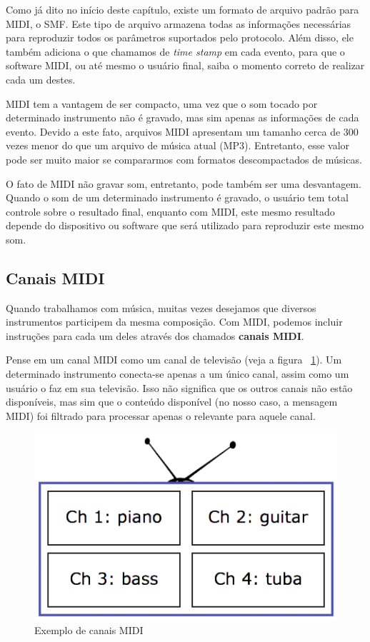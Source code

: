             Como já dito no início deste capítulo, existe um formato de arquivo padrão para MIDI, o SMF. Este tipo de arquivo armazena todas as informações necessárias para reproduzir todos os parâmetros suportados pelo protocolo. Além disso, ele também adiciona o que chamamos de \textit{time stamp} em cada evento, para que o software MIDI, ou até mesmo o usuário final, saiba o momento correto de realizar cada um destes.

            MIDI tem a vantagem de ser compacto, uma vez que o som tocado por determinado instrumento não é gravado, mas sim apenas as informações de cada evento. Devido a este fato, arquivos MIDI apresentam um tamanho cerca de 300 vezes menor do que um arquivo de música atual (MP3). Entretanto, esse valor pode ser muito maior se compararmos com formatos descompactados de músicas.

            O fato de MIDI não gravar som, entretanto, pode também ser uma desvantagem. Quando o som de um determinado instrumento é gravado, o usuário tem total controle sobre o resultado final, enquanto com MIDI, este mesmo resultado depende do dispositivo ou software que será utilizado para reproduzir este mesmo som.

        \subsection{Canais MIDI}

            Quando trabalhamos com música, muitas vezes desejamos que diversos instrumentos participem da mesma composição. Com MIDI, podemos incluir instruções para cada um deles através dos chamados \textbf{canais MIDI}.

            Pense em um canal MIDI como um canal de televisão (veja a figura ~\ref{fig:midi-channels}). Um determinado instrumento conecta-se apenas a um único canal, assim como um usuário o faz em sua televisão. Isso não significa que os outros canais não estão disponíveis, mas sim que o conteúdo disponível (no nosso caso, a mensagem MIDI) foi filtrado para processar apenas o relevante para aquele canal.

            \begin{figure}[H]
            	\centering
            	\includegraphics[scale=0.6]{Imagens/midi-channels.png}
            	\caption[Exemplo de canais MIDI]{Exemplo de canais MIDI ~\cite{Gibson2013}}
            	\label{fig:midi-channels}
            \end{figure}

